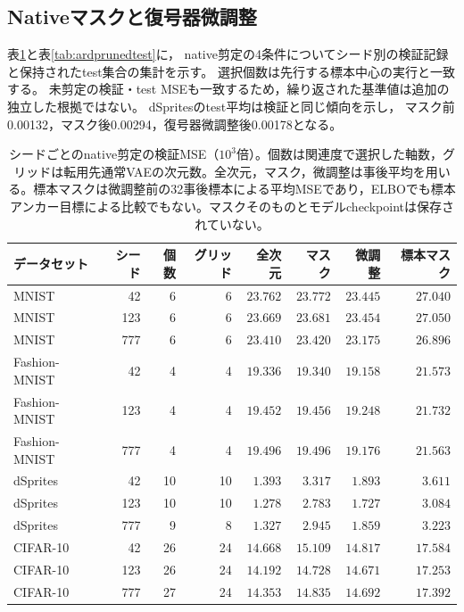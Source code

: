 \documentclass[11pt,a4paper]{ltjsarticle}
\begin{document}
\subsection{Nativeマスクと復号器微調整}
表\ref{tab:ardprunedseeds}と表\ref{tab:ardprunedtest}に，
native剪定の4条件についてシード別の検証記録と保持されたtest集合の集計を示す。
選択個数は先行する標本中心の実行と一致する。
未剪定の検証・test MSEも一致するため，繰り返された基準値は追加の独立した根拠ではない。
dSpritesのtest平均は検証と同じ傾向を示し，
マスク前0.00132，マスク後0.00294，復号器微調整後0.00178となる。
\begin{table}[H]
\caption{シードごとのnative剪定の検証MSE（$10^3$倍）。個数は関連度で選択した軸数，グリッドは転用先通常VAEの次元数。全次元，マスク，微調整は事後平均を用いる。標本マスクは微調整前の32事後標本による平均MSEであり，ELBOでも標本アンカー目標による比較でもない。マスクそのものとモデルcheckpointは保存されていない。}\label{tab:ardprunedseeds}
\footnotesize
\setlength{\tabcolsep}{3pt}
\begin{tabular*}{\textwidth}{@{\extracolsep{\fill}}lrrrrrrr@{}}
\toprule
データセット & シード & 個数 & グリッド & 全次元 & マスク & 微調整 & 標本マスク \\
\midrule
MNIST & 42 & 6 & 6 & $23.762$ & $23.772$ & $23.445$ & $27.040$ \\
MNIST & 123 & 6 & 6 & $23.669$ & $23.681$ & $23.454$ & $27.050$ \\
MNIST & 777 & 6 & 6 & $23.410$ & $23.420$ & $23.175$ & $26.896$ \\
Fashion-MNIST & 42 & 4 & 4 & $19.336$ & $19.340$ & $19.158$ & $21.573$ \\
Fashion-MNIST & 123 & 4 & 4 & $19.452$ & $19.456$ & $19.248$ & $21.732$ \\
Fashion-MNIST & 777 & 4 & 4 & $19.496$ & $19.496$ & $19.176$ & $21.563$ \\
dSprites & 42 & 10 & 10 & $1.393$ & $3.317$ & $1.893$ & $3.611$ \\
dSprites & 123 & 10 & 10 & $1.278$ & $2.783$ & $1.727$ & $3.084$ \\
dSprites & 777 & 9 & 8 & $1.327$ & $2.945$ & $1.859$ & $3.223$ \\
CIFAR-10 & 42 & 26 & 24 & $14.668$ & $15.109$ & $14.817$ & $17.584$ \\
CIFAR-10 & 123 & 26 & 24 & $14.192$ & $14.728$ & $14.671$ & $17.253$ \\
CIFAR-10 & 777 & 27 & 24 & $14.353$ & $14.835$ & $14.692$ & $17.392$ \\
\bottomrule\end{tabular*}
\end{table}
\end{document}
